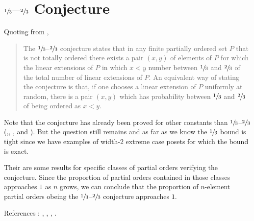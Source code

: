 \section{$\sfrac{1}{3}$--$\sfrac{2}{3}$ Conjecture}

Quoting from \cite{wiki:linext},

\begin{quotation}
The $\sfrac{1}{3}$--$\sfrac{2}{3}$ conjecture states that in any finite partially ordered set $P$ that is not totally ordered there exists a pair $(x,y)$ of elements of $P$ for which the linear extensions of $P$ in which $x < y$ number between $\sfrac{1}{3}$ and $\sfrac{2}{3}$ of the total number of linear extensions of $P$. An equivalent way of stating the conjecture is that, if one chooses a linear extension of $P$ uniformly at random, there is a pair $(x,y)$ which has probability between $\sfrac{1}{3}$ and $\sfrac{2}{3}$ of being ordered as $x < y$.
\end{quotation}

Note that the conjecture has already been proved for other constants than $\sfrac{1}{3}$--$\sfrac{2}{3}$ (\cite{kahn1984balancing},\cite{linial1984information}, \cite{kahn1991balancing}, \cite{brightwell1995balancing} and \cite{brightwell1999balanced}). But the question still remains and as far as we know the $\sfrac{1}{3}$ bound is tight since we have examples of width-$2$ extreme case posets for which the bound is exact. 


Their are some results for specific classes of partial orders verifying the conjecture. Since the proportion of partial orders contained in those classes approaches $1$ as $n$ grows, we can conclude that the proportion of $n$-element partial orders obeing the $\sfrac{1}{3}$--$\sfrac{2}{3}$ conjecture approaches $1$.


References : \cite{kral2013new}, \cite{zaguia20111}, \cite{peczarski2006gold}, \cite{peczarski2008gold}.